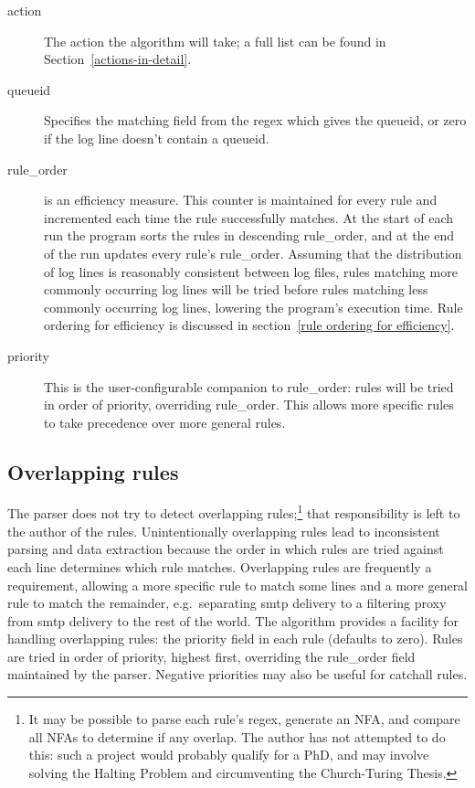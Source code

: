 \documentclass[a4paper,12pt,draft]{article}
\begin{document}
\begin{description}
    \item [action] The action the algorithm will take; a full list can be
        found in Section~\ref{actions-in-detail}.

    \item [queueid] Specifies the matching field from the regex which gives
        the queueid, or zero if the log line doesn't contain a queueid.

    \item [rule\_order] is an efficiency measure.  This counter is
        maintained for every rule and incremented each time the rule
        successfully matches.  At the start of each run the program sorts
        the rules in descending rule\_order, and at the end of the run
        updates every rule's rule\_order.  Assuming that the distribution
        of log lines is reasonably consistent between log files, rules
        matching more commonly occurring log lines will be tried before
        rules matching less commonly occurring log lines, lowering the
        program's execution time.  Rule ordering for efficiency is
        discussed in section~\ref{rule ordering for efficiency}.

    \item [priority] This is the user-configurable companion to
        rule\_order: rules will be tried in order of priority, overriding
        rule\_order.  This allows more specific rules to take precedence
        over more general rules.

\end{description}


\subsection{Overlapping rules}

The parser does not try to detect overlapping rules;\footnote{It may be
possible to parse each rule's regex, generate an NFA, and compare all NFAs
to determine if any overlap.  The author has not attempted to do this: such
a project would probably qualify for a PhD, and may involve solving the
Halting Problem and circumventing the Church-Turing Thesis.} that
responsibility is left to the author of the rules.  Unintentionally
overlapping rules lead to inconsistent parsing and data extraction because
the order in which rules are tried against each line determines which rule
matches.  Overlapping rules are frequently a requirement, allowing a more
specific rule to match some lines and a more general rule to match the
remainder, e.g.\ separating smtp delivery to a filtering proxy from smtp
delivery to the rest of the world.  The algorithm provides a facility for
handling overlapping rules: the priority field in each rule (defaults to
zero).  Rules are tried in order of priority, highest first, overriding the
rule\_order field maintained by the parser.  Negative priorities may also
be useful for catchall rules.
\end{document}
